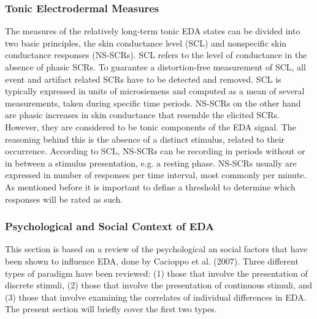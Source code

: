 \subsubsection*{Tonic Electrodermal Measures}
The measures of the relatively long-term tonic EDA states can be divided into two basic principles, the skin conductance level (SCL) and nonspecific skin conductance responses (NS-SCRs). SCL refers to the level of conductance in the absence of phasic SCRs. To guarantee a distortion-free measurement of SCL, all event and artifact related SCRs have to be detected and removed. SCL is typically expressed in units of microsiemens and computed as a mean of several measurements, taken during specific time periods.
NS-SCRs on the other hand are phasic increases in skin conductance that resemble the elicited SCRs. However, they are considered to be tonic components of the EDA signal. The reasoning behind this is the absence of a distinct stimulus, related to their occurrence. According to SCL, NS-SCRs can be recording in periods without or in between a stimulus presentation, e.g. a resting phase. NS-SCRs usually are expressed in number of responses per time interval, most commonly per minute. As mentioned before it is important to define a threshold to determine which responses will be rated as such.\\

\subsubsection{Psychological and Social Context of EDA}
This section is based on a review of the psychological an social factors that have been shown to influence EDA, done by Cacioppo et al. (2007). Three different types of paradigm have been reviewed: (1) those that involve the presentation of discrete stimuli, (2) those that involve the presentation of continuous stimuli, and (3) those that involve examining the correlates of individual differences in EDA. The present section will briefly cover the first two types.

